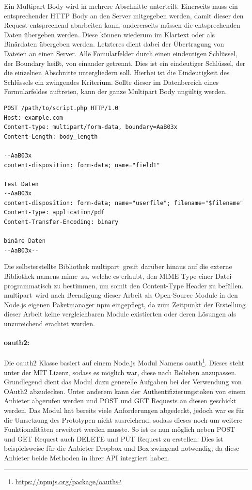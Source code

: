 Ein Multipart Body wird in mehrere Abschnitte unterteilt.
Einerseits muss ein entsprechender \ac{HTTP} Body an den Server mitgegeben werden, damit dieser den Request entsprechend abarbeiten kann, andererseits müssen die entsprechenden Daten übergeben werden.
Diese können wiederum im Klartext oder als Binärdaten übergeben werden.
Letzteres dient dabei der Übertragung von Dateien an einen Server.
Alle Fomularfelder durch einen eindeutigen Schlüssel, der Boundary heißt, von einander getrennt.
Dies ist ein eindeutiger Schlüssel, der die einzelnen Abschnitte untergliedern soll.
Hierbei ist die Eindeutigkeit des Schlüssels ein zwingendes Kriterium.
Sollte dieser im Datenbereich eines Formularfeldes auftreten, kann der ganze Multipart Body ungültig werden.

\lstset{
    language=PHP
}
\begin{lstlisting}[label=fig-implementierung-multipart,caption=Beispiel eines HTTP Multipart Bodies]
POST /path/to/script.php HTTP/1.0
Host: example.com
Content-type: multipart/form-data, boundary=AaB03x
Content-Length: body_length

--AaB03x
content-disposition: form-data; name="field1"

Test Daten
--AaB03x
content-disposition: form-data; name="userfile"; filename="$filename"
Content-Type: application/pdf
Content-Transfer-Encoding: binary

binäre Daten
--AaB03x--
\end{lstlisting}
\lstset{
    language=JavaScript
}

Die selbsterstellte Bibliothek \frqq multipart\flqq\ greift darüber hinaus auf die externe Bibliothek namens \frqq mime\flqq\ zu, welche es erlaubt, den \ac{MIME} Type einer Datei programmatisch zu bestimmen, um somit den Content-Type Header zu befüllen.
\frqq multipart\flqq\ wird nach Beendigung dieser Arbeit als Open-Source Module in den Node.js eigenen Paketmanager npm eingepflegt, da zum Zeitpunkt der Erstellung dieser Arbeit keine vergleichbaren Module existierten oder deren Lösungen als unzureichend erachtet wurden.

\paragraph{oauth2:}
Die oauth2 Klasse basiert auf einem Node.js Modul Namens \frqq oauth\flqq \footnote{\url{https://npmjs.org/package/oauth}}.
Dieses steht unter der MIT Lizenz, sodass es möglich war, diese nach Belieben anzupassen.
Grundlegend dient das Modul dazu generelle Aufgaben bei der Verwendung von OAuth2 abzudecken.
Unter anderem kann der Authentifizierungstoken von einem Anbieter abgerufen werden und POST und GET Requests an diesen geschickt werden.
Das Modul hat bereits viele Anforderungen abgedeckt, jedoch war es für die Umsetzung des Prototypen nicht ausreichend, sodass dieses noch um weitere Funktionalitäten erweitert werden musste.
So ist es nun möglich neben POST und GET Request auch DELETE und PUT Request zu erstellen.
Dies ist beispielsweise für die Anbieter Dropbox und Box zwingend notwendig, da diese Anbieter beide Methoden in ihrer \ac{API} integriert haben.

